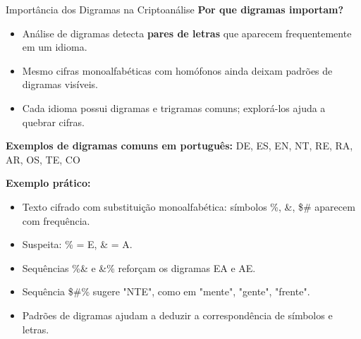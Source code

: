 \begin{frame}{Importância dos Digramas na Criptoanálise}
    \textbf{Por que digramas importam?}
    \begin{itemize}
        \item Análise de digramas detecta \textbf{pares de letras} que aparecem frequentemente em um idioma.
        \item Mesmo cifras monoalfabéticas com homófonos ainda deixam padrões de digramas visíveis.
        \item Cada idioma possui digramas e trigramas comuns; explorá-los ajuda a quebrar cifras.
    \end{itemize}

    \medskip
    \textbf{Exemplos de digramas comuns em português:} DE, ES, EN, NT, RE, RA, AR, OS, TE, CO

    \medskip
    \textbf{Exemplo prático:}
    \begin{itemize}
        \item Texto cifrado com substituição monoalfabética: símbolos \%, \&, \$\# aparecem com frequência.
        \item Suspeita: \% = E, \& = A.
        \item Sequências \%\& e \&\% reforçam os digramas EA e AE.
        \item Sequência \$\#\% sugere "NTE", como em "mente", "gente", "frente".
        \item Padrões de digramas ajudam a deduzir a correspondência de símbolos e letras.
    \end{itemize}



\end{frame}

